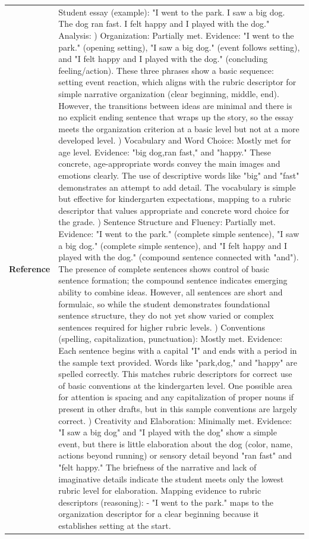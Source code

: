 \begin{longtable}{@{}l p{13cm}@{}}
  \textbf{Reference} & Student essay (example): "I went to the park. I saw a big dog. The dog ran fast. I felt happy and I played with the dog." \newline Analysis: \newline 1) Organization: Partially met. Evidence: "I went to the park." (opening setting), "I saw a big dog." (event follows setting), and "I felt happy and I played with the dog." (concluding feeling/action). These three phrases show a basic sequence: setting event reaction, which aligns with the rubric descriptor for simple narrative organization (clear beginning, middle, end). However, the transitions between ideas are minimal and there is no explicit ending sentence that wraps up the story, so the essay meets the organization criterion at a basic level but not at a more developed level. \newline 2) Vocabulary and Word Choice: Mostly met for age level. Evidence: "big dog,ran fast," and "happy." These concrete, age-appropriate words convey the main images and emotions clearly. The use of descriptive words like "big" and "fast" demonstrates an attempt to add detail. The vocabulary is simple but effective for kindergarten expectations, mapping to a rubric descriptor that values appropriate and concrete word choice for the grade. \newline 3) Sentence Structure and Fluency: Partially met. Evidence: "I went to the park." (complete simple sentence), "I saw a big dog." (complete simple sentence), and "I felt happy and I played with the dog." (compound sentence connected with "and"). The presence of complete sentences shows control of basic sentence formation; the compound sentence indicates emerging ability to combine ideas. However, all sentences are short and formulaic, so while the student demonstrates foundational sentence structure, they do not yet show varied or complex sentences required for higher rubric levels. \newline 4) Conventions (spelling, capitalization, punctuation): Mostly met. Evidence: Each sentence begins with a capital "I" and ends with a period in the sample text provided. Words like "park,dog," and "happy" are spelled correctly. This matches rubric descriptors for correct use of basic conventions at the kindergarten level. One possible area for attention is spacing and any capitalization of proper nouns if present in other drafts, but in this sample conventions are largely correct. \newline 5) Creativity and Elaboration: Minimally met. Evidence: "I saw a big dog" and "I played with the dog" show a simple event, but there is little elaboration about the dog (color, name, actions beyond running) or sensory detail beyond "ran fast" and "felt happy." The briefness of the narrative and lack of imaginative details indicate the student meets only the lowest rubric level for elaboration. \newline Mapping evidence to rubric descriptors (reasoning): \newline - "I went to the park." maps to the organization descriptor for a clear beginning because it establishes setting at the start. \newline 
\end{longtable}
